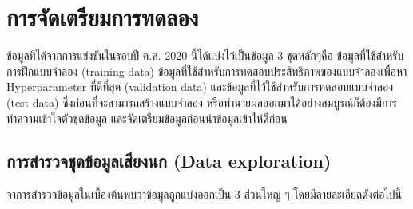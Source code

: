 \section{การจัดเตรียมการทดลอง}
ข้อมูลที่ได้จากการแข่งขันในรอบปี ค.ศ. 2020 นี้ได้แบ่งไว้เป็นข้อมูล 3 ชุดหลักๆคือ ข้อมูลที่ใช้สำหรับการฝึกแบบจำลอง (training data) ข้อมูลที่ใช้สำหรับการทดสอบประสิทธิภาพของแบบจำลองเพื่อหา Hyperparameter ที่ดีที่สุด (validation data) และข้อมูลที่ไว้ใช้สำหรับการทดสอบแบบจำลอง (test data) ซึ่งก่อนที่จะสามารถสร้างแบบจำลอง
หรือทำนายผลออกมาได้อย่างสมบูรณ์ก็ต้องมีการ ทำความเข้าใจตัวชุดข้อมูล และจัดเตรียมข้อมูลก่อนนำข้อมูลเข้าให้ดีก่อน
\subsection{การสำรวจชุดข้อมูลเสียงนก (Data exploration)}
จาการสำรวจข้อมูลในเบื้องต้นพบว่าข้อมูลถูกแบ่งออกเป็น 3 ส่วนใหญ่ ๆ โดยมีลายละเอียดดังต่อไปนี้

